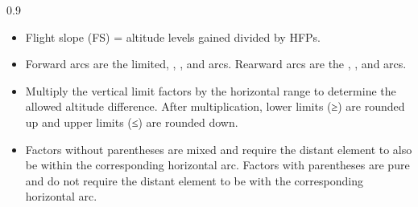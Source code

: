 \begin{twocolumntablefloat}
\begin{twocolumntable}
\smallskip

\begin{tablenote}{0.9\linewidth}\footnotesize
\begin{itemize}

\item
Flight slope (FS) = altitude levels gained divided by HFPs.

\item Forward arcs are the limited, , , and  arcs. Rearward arcs are the ,  , and   arcs. 

\item
Multiply the vertical limit factors by the horizontal range to determine the allowed altitude difference. After multiplication, lower limits (≥) are rounded up and upper limits (≤) are rounded down. 

\item
Factors without parentheses are mixed and require the distant element to also be within the corresponding horizontal arc. Factors with parentheses are pure and do not require the distant element to be with the corresponding horizontal arc. 

\end{itemize}
\end{tablenote}


\end{twocolumntable}
\end{twocolumntablefloat}
